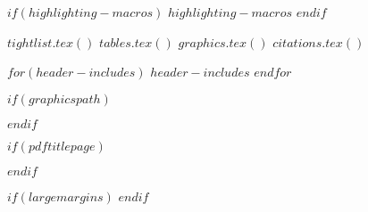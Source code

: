 
$if(highlighting-macros)$
$highlighting-macros$
$endif$

$tightlist.tex()$
$tables.tex()$
$graphics.tex()$
$citations.tex()$

$for(header-includes)$
$header-includes$
$endfor$



$if(graphicspath)$
\graphicspath{{$graphicspath$/}}
$endif$


\usepackage[tikz]{bclogo}
\newenvironment{Summary}
  {\begin{bclogo}[logo=\bctrombone, noborder=true, couleur=lightgray!50]{$chaptersummary$}\parindent0pt}
  {\end{bclogo}}
%


$if(pdftitlepage)$
\usepackage{pdfpages}
$endif$


$if(largemargins)$
\captionnamefont{\scriptsize}
\captiontitlefont{\scriptsize}
\renewcommand{\footnotesize}{\tiny}
$endif$


\usepackage{titletoc}
\newcommand{\toc}[1]{%
  \startcontents[chapters]%
  \printcontents[chapters]{}{1}[#1]{}%
  ~\newline%
}





\newcommand{\MemoirChapStyle}{$MemoirChapStyle$}
\newcommand{\MemoirPageStyle}{$MemoirPageStyle$}

\usepackage{parskip}
  \abnormalparskip{3pt}

\usepackage{marginfix}


